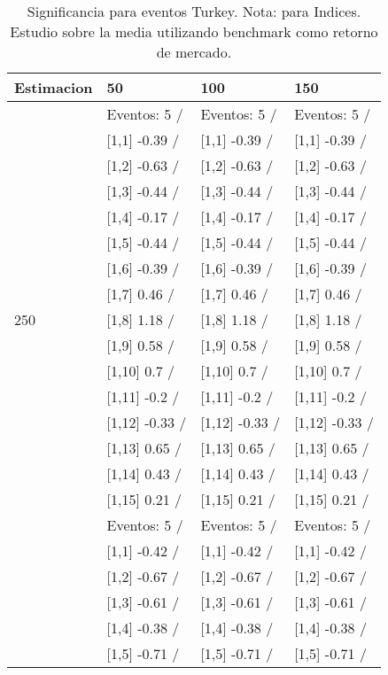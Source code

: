 \begin{table}

\caption{Significancia para eventos Turkey. Nota: para Indices. Estudio sobre la media utilizando benchmark como retorno de mercado.}
\centering
\begin{tabular}[t]{llll}
\toprule
Estimacion & 50 & 100 & 150\\
\midrule
 & Eventos:  5 / & Eventos:  5 / & Eventos:  5 /\\
 & {}[1,1] -0.39  / & {}[1,1] -0.39  / & {}[1,1] -0.39  /\\
 & {}[1,2] -0.63  / & {}[1,2] -0.63  / & {}[1,2] -0.63  /\\
 & {}[1,3] -0.44  / & {}[1,3] -0.44  / & {}[1,3] -0.44  /\\
 & {}[1,4] -0.17  / & {}[1,4] -0.17  / & {}[1,4] -0.17  /\\
\addlinespace
 & {}[1,5] -0.44  / & {}[1,5] -0.44  / & {}[1,5] -0.44  /\\
 & {}[1,6] -0.39  / & {}[1,6] -0.39  / & {}[1,6] -0.39  /\\
 & {}[1,7] 0.46  / & {}[1,7] 0.46  / & {}[1,7] 0.46  /\\
250 & {}[1,8] 1.18  / & {}[1,8] 1.18  / & {}[1,8] 1.18  /\\
 & {}[1,9] 0.58  / & {}[1,9] 0.58  / & {}[1,9] 0.58  /\\
\addlinespace
 & {}[1,10] 0.7  / & {}[1,10] 0.7  / & {}[1,10] 0.7  /\\
 & {}[1,11] -0.2  / & {}[1,11] -0.2  / & {}[1,11] -0.2  /\\
 & {}[1,12] -0.33  / & {}[1,12] -0.33  / & {}[1,12] -0.33  /\\
 & {}[1,13] 0.65  / & {}[1,13] 0.65  / & {}[1,13] 0.65  /\\
 & {}[1,14] 0.43  / & {}[1,14] 0.43  / & {}[1,14] 0.43  /\\
\addlinespace
 & {}[1,15] 0.21  / & {}[1,15] 0.21  / & {}[1,15] 0.21  /\\
 & Eventos:  5 / & Eventos:  5 / & Eventos:  5 /\\
 & {}[1,1] -0.42  / & {}[1,1] -0.42  / & {}[1,1] -0.42  /\\
 & {}[1,2] -0.67  / & {}[1,2] -0.67  / & {}[1,2] -0.67  /\\
 & {}[1,3] -0.61  / & {}[1,3] -0.61  / & {}[1,3] -0.61  /\\
\addlinespace
 & {}[1,4] -0.38  / & {}[1,4] -0.38  / & {}[1,4] -0.38  /\\
 & {}[1,5] -0.71  / & {}[1,5] -0.71  / & {}[1,5] -0.71  /\\

\end{tabular}
\end{table}
